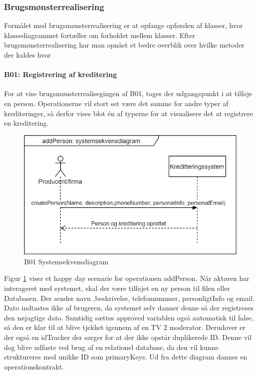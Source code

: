 \subsubsection{Brugsmønsterrealisering} Formålet med brugsmønsterrealisering er at opfange opførslen af klasser, hvor klassediagrammet fortæller om forholdet mellem klasser. Efter brugsmønsterrealisering har man opnået et bedre overblik over hvilke metoder der kaldes hvor

\paragraph{B01: Registrering af kreditering} For at vise brugsmønsterrealisegingen af B01, tages der udgangspunkt i at tilføje en person. Operationerne vil stort set være det samme for andre typer af krediteringer, så derfor vises blot én af typerne for at visualisere det at registrere en kreditering.

\begin{figure}[H]
    \centering
    \includegraphics[scale = 0.5]{images/B01SSD.png}
    \caption{B01 Systemsekvensdiagram}
    \label{fig:B01_Systemsekvensdiagram}
\end{figure}

Figur \ref{fig:B01_Systemsekvensdiagram} viser et happy day scenarie for operationen addPerson. Når aktøren har interageret med systemet, skal der være tilføjet en ny person til filen eller Databasen. Der sendes navn ,beskrivelse, telefonnummer, personligtInfo og email. Dato indtastes ikke af brugeren, da systemet selv danner denne så der registreses den nøjagtige dato. Samtidig sættes approved variablen også automatisk til false, så den er klar til at blive tjekket igennem af en TV 2 moderator. Derudover er der også en idTracker der sørger for at der ikke opstår duplikerede ID. Denne vil dog blive udfaste ved brug af en relationel database, da den vil kunne struktureres med unikke ID som primaryKeys.  Ud fra dette diagram dannes en operationskontrakt.



